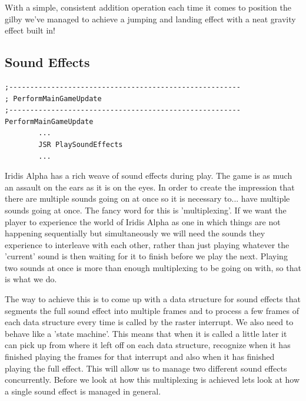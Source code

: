 With a simple, consistent addition operation each time it comes to position the gilby we've managed to achieve a jumping and
landing effect with a neat gravity effect built in!

\subsection{Sound Effects}
\begin{lstlisting}
;-------------------------------------------------------
; PerformMainGameUpdate
;-------------------------------------------------------
PerformMainGameUpdate
        ...
        JSR PlaySoundEffects
        ...
\end{lstlisting}

Iridis Alpha has a rich weave of sound effects during play. The game is as much an assault on the ears as it is on
the eyes. In order to create the impression that there are multiple sounds going on at once so it is necessary to... have
multiple sounds going at once. The fancy word for this is 'multiplexing'. If we want the player to experience the world
of Iridis Alpha as one in which things are not happening sequentially but simultaneously we will need the sounds they
experience to interleave with each other, rather than just playing whatever the 'current' sound is then waiting for it
to finish before we play the next. Playing two sounds at once is more than enough multiplexing to be going on with,
so that is what we do. 

The way to achieve this is to come up with a data structure for sound effects that segments the full sound effect
into multiple frames and to process a few frames of each data structure every time  is called
by the raster interrupt. We also need  to behave like a 'state machine'. This means that
when it is called a little later it can pick up from where it left off on each data structure, recognize
when it has finished playing the frames for that interrupt and also when it has finished playing the full effect. This
will allow us to manage two different sound effects concurrently. Before we look at how this multiplexing is achieved
lets look at how a single sound effect is managed in general.

